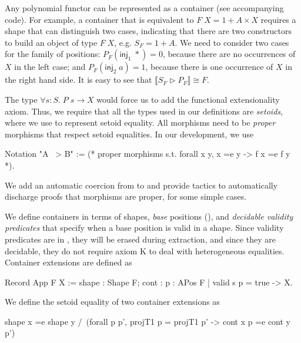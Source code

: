 \documentclass[a4paper,anonymous, UKenglish,cleveref, autoref, thm-restate]{lipics-v2021}
\begin{document}
Any polynomial functor can be represented as a container (see accompanying
code).  For example, a container that is equivalent to $F\; X = 1 + A \times X$
requires a shape that can distinguish two cases, indicating that there are two
constructors to build an object of type $F\;X$, e.g. $S_{F} = 1 + A$. We need to
consider two cases for the family of positions:
$P_{F}(\mathsf{inj}_{1}\;*) = 0$, because there are no occurrences of $X$ in the
left case; and $P_{F}(\mathsf{inj}_{2}\;a) = 1$, because there is one occurrence
of $X$ in the right hand side. It is easy to see that
$\llbracket S_{F} \triangleright P_{F} \rrbracket \cong F$.

The type $\forall s : S.\; P\;s \to X$ would force us to add
the functional extensionality axiom. Thus, we require that all the types used in
our definitions are \emph{setoids}, where we use  to represent
setoid equality. All morphisms need to be \emph{proper} morphisms that respect
setoid equalities. In our development, we use
\begin{coqcode}
Notation "A ~> B" := (* proper morphisms  s.t. forall x y, x =e y -> f x =e f y *).
\end{coqcode}
We add an automatic coercion from  to  and provide
tactics to automatically discharge proofs that morphisms are proper,  for some
simple cases.

We define containers in terms of shapes, \emph{base} positions
(), and \emph{decidable validity predicates} that specify when a
base position is valid in a shape. Since validity predicates are in ,
they will be erased during extraction, and since they are decidable, they
do not require axiom K to deal with heterogeneous equalities.
Container extensions are defined as
\begin{coqcode}
Record App F X := {shape : Shape F; cont : {p : APos F | valid s p = true} -> X}.
\end{coqcode}

We define the setoid equality of two container extensions  as
\begin{coqcode}
shape x =e shape y /\ (forall p p', projT1 p = projT1 p' -> cont x p =e cont y p')
\end{coqcode}
\end{document}
